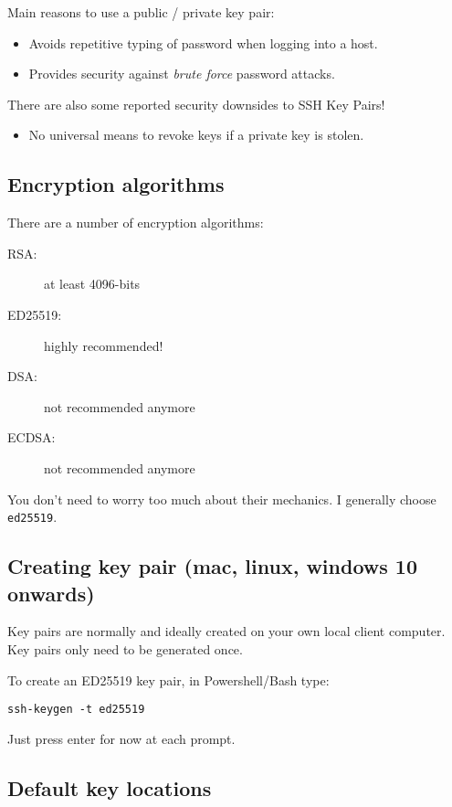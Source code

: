 \documentclass[slides]{pgnotes}
\begin{document}
Main reasons to use a public / private key pair:

\begin{itemize}
\item Avoids repetitive typing of password when logging into a host.
\item Provides security against \textit{brute force} password attacks.
\end{itemize}

There are also some reported security downsides to SSH Key Pairs!

\begin{itemize}
\item No universal means to revoke keys if a private key is stolen.
\end{itemize}


\subsection{Encryption algorithms}

There are a number of encryption algorithms:
\begin{description}
\item[RSA:] at least 4096-bits
\item[ED25519:] highly recommended!
\item[DSA:] not recommended anymore
\item[ECDSA:] not recommended anymore
\end{description}
You don't need to worry too much about their mechanics.
I generally choose \texttt{ed25519}.

\subsection{Creating key pair (mac, linux, windows 10 onwards)}
\label{sec:creating-key-pair-unix}

Key pairs are normally and ideally created on your own local client computer.
Key pairs only need to be generated once.

To create an ED25519 key pair, in Powershell/Bash type:

\begin{verbatim}
ssh-keygen -t ed25519
\end{verbatim}

Just press enter for now at each prompt.


\subsection{Default key locations}
\end{document}
